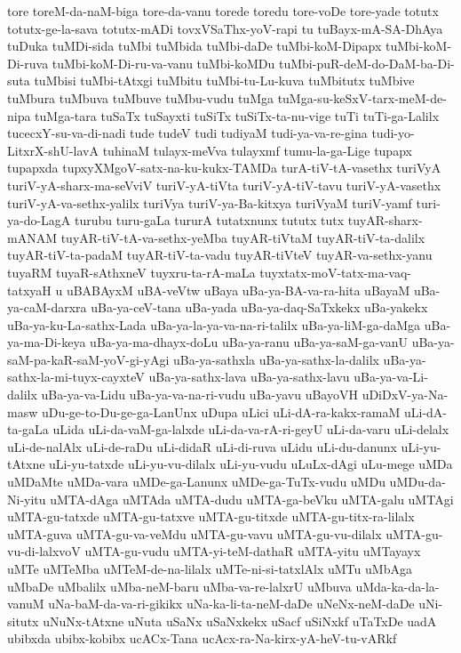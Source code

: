 {tore
toreM-da-naM-biga
tore-da-vanu
torede
toredu
tore-voDe
tore-yade
totutx
totutx-ge-la-sava
totutx-mADi
tovxVSaThx-yoV-rapi
tu
tuBayx-mA-SA-DhAya
tuDuka
tuMDi-sida
tuMbi
tuMbida
tuMbi-daDe
tuMbi-koM-Dipapx
tuMbi-koM-Di-ruva
tuMbi-koM-Di-ru-va-vanu
tuMbi-koMDu
tuMbi-puR-deM-do-DaM-ba-Di-suta
tuMbisi
tuMbi-tAtxgi
tuMbitu
tuMbi-tu-Lu-kuva
tuMbitutx
tuMbive
tuMbura
tuMbuva
tuMbuve
tuMbu-vudu
tuMga
tuMga-su-keSxV-tarx-meM-de-nipa
tuMga-tara
tuSaTx
tuSayxti
tuSiTx
tuSiTx-ta-nu-vige
tuTi
tuTi-ga-Lalilx
tucecxY-su-va-di-nadi
tude
tudeV
tudi
tudiyaM
tudi-ya-va-re-gina
tudi-yo-LitxrX-shU-lavA
tuhinaM
tulayx-meVva
tulayxmf
tumu-la-ga-Lige
tupapx
tupapxda
tupxyXMgoV-satx-na-ku-kukx-TAMDa
turA-tiV-tA-vasethx
turiVyA
turiV-yA-sharx-ma-seVviV
turiV-yA-tiVta
turiV-yA-tiV-tavu
turiV-yA-vasethx
turiV-yA-va-sethx-yalilx
turiVya
turiV-ya-Ba-kitxya
turiVyaM
turiV-yamf
turi-ya-do-LagA
turubu
turu-gaLa
tururA
tutatxnunx
tututx
tutx
tuyAR-sharx-mANAM
tuyAR-tiV-tA-va-sethx-yeMba
tuyAR-tiVtaM
tuyAR-tiV-ta-dalilx
tuyAR-tiV-ta-padaM
tuyAR-tiV-ta-vadu
tuyAR-tiVteV
tuyAR-va-sethx-yanu
tuyaRM
tuyaR-sAthxneV
tuyxru-ta-rA-maLa
tuyxtatx-moV-tatx-ma-vaq-tatxyaH
u
uBABAyxM
uBA-veVtw
uBaya
uBa-ya-BA-va-ra-hita
uBayaM
uBa-ya-caM-darxra
uBa-ya-ceV-tana
uBa-yada
uBa-ya-daq-SaTxkekx
uBa-yakekx
uBa-ya-ku-La-sathx-Lada
uBa-ya-la-ya-va-na-ri-talilx
uBa-ya-liM-ga-daMga
uBa-ya-ma-Di-keya
uBa-ya-ma-dhayx-doLu
uBa-ya-ranu
uBa-ya-saM-ga-vanU
uBa-ya-saM-pa-kaR-saM-yoV-gi-yAgi
uBa-ya-sathxla
uBa-ya-sathx-la-dalilx
uBa-ya-sathx-la-mi-tuyx-cayxteV
uBa-ya-sathx-lava
uBa-ya-sathx-lavu
uBa-ya-va-Li-dalilx
uBa-ya-va-Lidu
uBa-ya-va-na-ri-vudu
uBa-yavu
uBayoVH
uDiDxV-ya-Na-masw
uDu-ge-to-Du-ge-ga-LanUnx
uDupa
uLici
uLi-dA-ra-kakx-ramaM
uLi-dA-ta-gaLa
uLida
uLi-da-vaM-ga-lalxde
uLi-da-va-rA-ri-geyU
uLi-da-varu
uLi-delalx
uLi-de-nalAlx
uLi-de-raDu
uLi-didaR
uLi-di-ruva
uLidu
uLi-du-danunx
uLi-yu-tAtxne
uLi-yu-tatxde
uLi-yu-vu-dilalx
uLi-yu-vudu
uLuLx-dAgi
uLu-mege
uMDa
uMDaMte
uMDa-vara
uMDe-ga-Lanunx
uMDe-ga-TuTx-vudu
uMDu
uMDu-da-Ni-yitu
uMTA-dAga
uMTAda
uMTA-dudu
uMTA-ga-beVku
uMTA-galu
uMTAgi
uMTA-gu-tatxde
uMTA-gu-tatxve
uMTA-gu-titxde
uMTA-gu-titx-ra-lilalx
uMTA-guva
uMTA-gu-va-veMdu
uMTA-gu-vavu
uMTA-gu-vu-dilalx
uMTA-gu-vu-di-lalxvoV
uMTA-gu-vudu
uMTA-yi-teM-dathaR
uMTA-yitu
uMTayayx
uMTe
uMTeMba
uMTeM-de-na-lilalx
uMTe-ni-si-tatxlAlx
uMTu
uMbAga
uMbaDe
uMbalilx
uMba-neM-baru
uMba-va-re-lalxrU
uMbuva
uMda-ka-da-la-vanuM
uNa-baM-da-va-ri-gikikx
uNa-ka-li-ta-neM-daDe
uNeNx-neM-daDe
uNi-situtx
uNuNx-tAtxne
uNuta
uSaNx
uSaNxkekx
uSacf
uSiNxkf
uTaTxDe
uadA
ubibxda
ubibx-kobibx
ucACx-Tana
ucAcx-ra-Na-kirx-yA-heV-tu-vARkf
}
